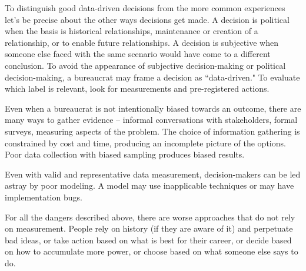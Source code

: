 To distinguish good data-driven decisions from the more common experiences let's be precise about the other ways decisions get made.
A decision is political when the basis is historical relationships, maintenance or creation of a relationship, or to enable future relationships. 
A decision is subjective when someone else faced with the same scenario would have come to a different conclusion. To avoid the appearance of subjective decision-making or political decision-making, a bureaucrat may frame a decision as ``data-driven." To evaluate which label is relevant, look for measurements and pre-registered actions. 


Even when a bureaucrat is not intentionally biased towards an outcome, there are many ways to gather evidence -- informal conversations with stakeholders, formal surveys, measuring aspects of the problem. The choice of information gathering is constrained by cost and time, producing an incomplete picture of the options. Poor data collection with biased sampling produces biased results. 

Even with valid and representative data measurement, decision-makers can be led astray by poor modeling. A model may use inapplicable techniques or may have implementation bugs.

For all the dangers described above,
there are worse approaches that do not rely on measurement. People rely on history (if they are aware of it) and perpetuate bad ideas, or take action based on what is best for their career, or decide based on how to accumulate more power, or choose based on what someone else says to do.  

